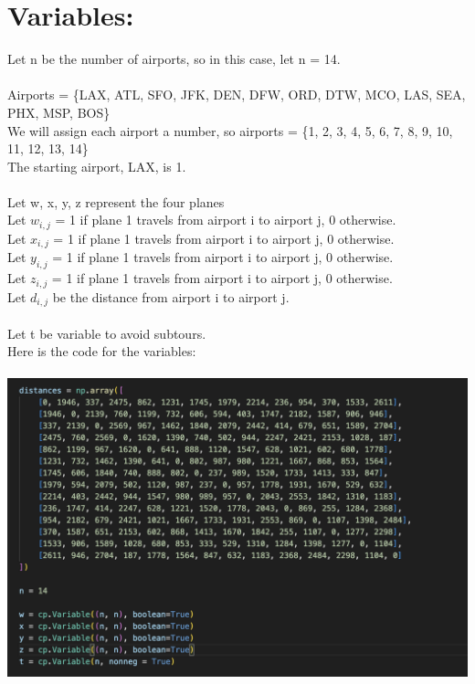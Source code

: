 \documentclass[12pt]{extarticle}
\begin{document}
\section*{\small Variables:}
Let n be the number of airports, so in this case, let n = 14. \\ \\
Airports = \{LAX, ATL, SFO, JFK, DEN, DFW, ORD, DTW, MCO, LAS, SEA, PHX, MSP, BOS\} \\
We will assign each airport a number, so airports = \{1, 2, 3, 4, 5, 6, 7, 8, 9, 10, 11, 12, 13, 14\} \\
The starting airport, LAX, is 1. \\ \\
Let w, x, y, z represent the four planes \\
Let $w_{i,j}$ = 1 if plane 1 travels from airport i to airport j, 0 otherwise. \\
Let $x_{i,j}$ = 1 if plane 1 travels from airport i to airport j, 0 otherwise. \\
Let $y_{i,j}$ = 1 if plane 1 travels from airport i to airport j, 0 otherwise. \\
Let $z_{i,j}$ = 1 if plane 1 travels from airport i to airport j, 0 otherwise. \\
Let $d_{i,j}$ be the distance from airport i to airport j. \\ \\
Let t be variable to avoid subtours. \\
Here is the code for the variables: \\ \\
\includegraphics[scale = .5]{images/OptVars.png}
\end{document}
